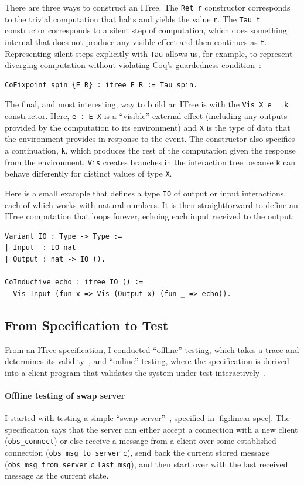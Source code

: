 \documentclass{article}
\newcommand{\ilc}[1]{\lstinline[style=customcoq]{#1}}
\theoremstyle{definition}
\begin{document}
There are three ways to construct an ITree. The \ilc{Ret r} constructor
corresponds to the trivial computation that halts and yields the value
\ilc{r}. The \ilc{Tau t} constructor corresponds to a silent step of
computation, which does something internal that does not produce any visible
effect and then continues as \ilc{t}.  Representing silent steps explicitly with
\ilc{Tau} allows us, for example, to represent diverging computation without
violating Coq's guardedness condition~\cite{coinduction}:

\begin{lstlisting}[style=customcoq]
CoFixpoint spin {E R} : itree E R := Tau spin.
\end{lstlisting}

The final, and most interesting, way to build an ITree is with the \ilc{Vis X e
  k} constructor.  Here, \ilc{e : E X} is a ``visible'' external effect
(including any outputs provided by the computation to its environment) and
\ilc{X} is the type of data that the environment provides in response to the
event.  The constructor also specifies a continuation, \ilc{k}, which produces
the rest of the computation given the response from the environment.  \ilc{Vis}
creates branches in the interaction tree because \ilc{k} can behave differently
for distinct values of type \ilc{X}.

Here is a small example that defines a type \ilc{IO} of output or input
interactions, each of which works with natural numbers.  It is then
straightforward to define an ITree computation that loops forever, echoing each
input received to the output:

\begin{lstlisting}[style=customcoq]
Variant IO : Type -> Type :=
| Input  : IO nat
| Output : nat -> IO ().

CoInductive echo : itree IO () :=
  Vis Input (fun x => Vis (Output x) (fun _ => echo)).
\end{lstlisting}

\subsection{From Specification to Test}
\label{sec:spec-to-test}
From an ITree specification, I conducted ``offline'' testing, which takes a
trace and determines its validity~\cite{cpp19}, and ``online'' testing, where
the specification is derived into a client program that validates the system
under test interactively~\cite{issta21}.

\paragraph{Offline testing of swap server}
I started with testing a simple ``swap server''~\cite{cpp19}, specified in
\autoref{fig:linear-spec}.  The specification says that the server can either
accept a connection with a new client (\ilc{obs_connect}) or else receive a
message from a client over some established connection (\ilc{obs_msg_to_server}
\ilc{c}), send back the current stored message (\ilc{obs_msg_from_server}
\ilc{c} \ilc{last_msg}), and then start over with the last received message as
the current state.
\end{document}
